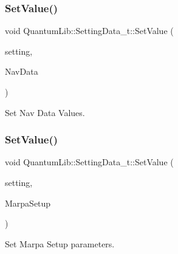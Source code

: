 \subsubsection{\texorpdfstring{Set\+Value()}{SetValue()}\hspace{0.1cm}{\footnotesize\ttfamily [23/26]}}
{\footnotesize\ttfamily void Quantum\+Lib\+::\+Setting\+Data\+\_\+t\+::\+Set\+Value (\begin{DoxyParamCaption}\item[{\mbox{\hyperlink{namespace_quantum_lib_acc8124e3e65bca4aa798d03a55e3d54c}{e\+Settings\+\_\+t}}}]{setting,  }\item[{\mbox{\hyperlink{struct_quantum_lib_1_1_nav_data__t}{Nav\+Data\+\_\+t}} \&}]{Nav\+Data }\end{DoxyParamCaption})\hspace{0.3cm}{\ttfamily [inline]}}



Set Nav Data Values. 

\mbox{\label{struct_quantum_lib_1_1_setting_data__t_a313c27d080a46a9c55dfbd4b2c78eb76}} 
\subsubsection{\texorpdfstring{Set\+Value()}{SetValue()}\hspace{0.1cm}{\footnotesize\ttfamily [24/26]}}
{\footnotesize\ttfamily void Quantum\+Lib\+::\+Setting\+Data\+\_\+t\+::\+Set\+Value (\begin{DoxyParamCaption}\item[{\mbox{\hyperlink{namespace_quantum_lib_acc8124e3e65bca4aa798d03a55e3d54c}{e\+Settings\+\_\+t}}}]{setting,  }\item[{\mbox{\hyperlink{struct_quantum_lib_1_1_marpa_setup__t}{Marpa\+Setup\+\_\+t}} \&}]{Marpa\+Setup }\end{DoxyParamCaption})\hspace{0.3cm}{\ttfamily [inline]}}



Set Marpa Setup parameters. 

\mbox{\label{struct_quantum_lib_1_1_setting_data__t_a29f9db2fed691c198b5c231ac0fb78ae}} 
